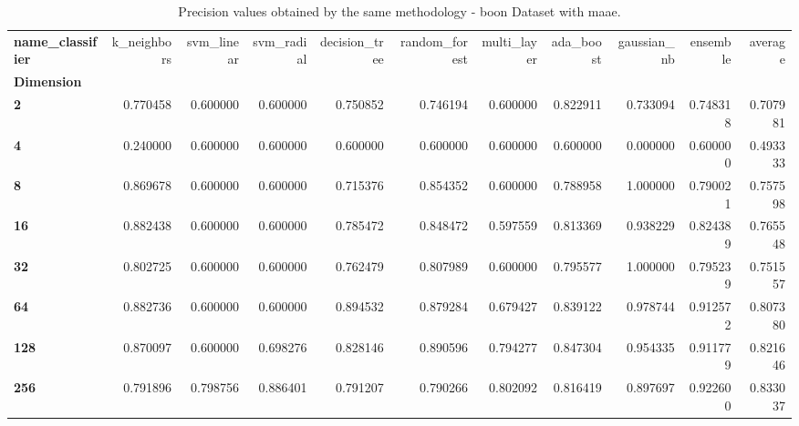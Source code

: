 \begin{table}
\centering
\caption{Precision values obtained by the same methodology - boon Dataset with maae.}
\label{precision_boon_maae-reproduction}
\begin{tabular}{lrrrrrrrrrr}
\toprule
\textbf{name\_classifier} &  k\_neighbors &  svm\_linear &  svm\_radial &  decision\_tree &  random\_forest &  multi\_layer &  ada\_boost &  gaussian\_nb &  ensemble &   average \\
\textbf{Dimension} &              &             &             &                &                &              &            &              &           &           \\
\midrule
\textbf{2        } &     0.770458 &    0.600000 &    0.600000 &       0.750852 &       0.746194 &     0.600000 &   0.822911 &     0.733094 &  0.748318 &  0.707981 \\
\textbf{4        } &     0.240000 &    0.600000 &    0.600000 &       0.600000 &       0.600000 &     0.600000 &   0.600000 &     0.000000 &  0.600000 &  0.493333 \\
\textbf{8        } &     0.869678 &    0.600000 &    0.600000 &       0.715376 &       0.854352 &     0.600000 &   0.788958 &     1.000000 &  0.790021 &  0.757598 \\
\textbf{16       } &     0.882438 &    0.600000 &    0.600000 &       0.785472 &       0.848472 &     0.597559 &   0.813369 &     0.938229 &  0.824389 &  0.765548 \\
\textbf{32       } &     0.802725 &    0.600000 &    0.600000 &       0.762479 &       0.807989 &     0.600000 &   0.795577 &     1.000000 &  0.795239 &  0.751557 \\
\textbf{64       } &     0.882736 &    0.600000 &    0.600000 &       0.894532 &       0.879284 &     0.679427 &   0.839122 &     0.978744 &  0.912572 &  0.807380 \\
\textbf{128      } &     0.870097 &    0.600000 &    0.698276 &       0.828146 &       0.890596 &     0.794277 &   0.847304 &     0.954335 &  0.911779 &  0.821646 \\
\textbf{256      } &     0.791896 &    0.798756 &    0.886401 &       0.791207 &       0.790266 &     0.802092 &   0.816419 &     0.897697 &  0.922600 &  0.833037 \\
\bottomrule
\end{tabular}
\end{table}
